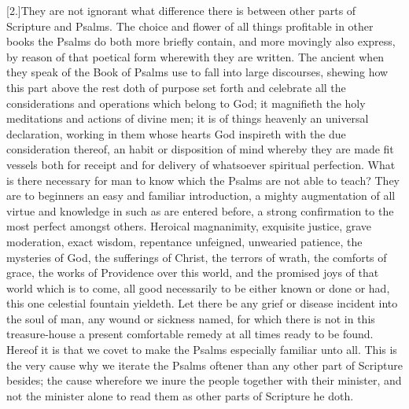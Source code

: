 [2.]They are not ignorant what difference there is between other parts of Scripture and Psalms. The choice and flower of all things profitable in other books the Psalms do both more briefly contain, and more movingly also express, by reason of that poetical form wherewith they are written. The ancient when they speak of the Book of Psalms use to fall into large discourses, shewing how this part above the rest doth of purpose set forth and celebrate all the considerations and operations which belong to God; it magnifieth the holy  meditations and actions of divine men;
 it is of things heavenly an universal declaration, working in them whose hearts God inspireth with the due consideration thereof, an habit or disposition of mind whereby they are made fit vessels both for receipt and for delivery of whatsoever spiritual perfection. What is there necessary for man to know which the Psalms are not able to teach? They are to beginners an easy and familiar introduction, a mighty augmentation of all virtue and knowledge in such as are entered before, a strong confirmation to the most perfect amongst others. Heroical magnanimity, exquisite justice, grave moderation, exact wisdom, repentance unfeigned, unwearied patience, the mysteries of God, the sufferings of Christ, the terrors of wrath, the comforts of grace, the works of Providence over this world, and the promised joys of that world which is to come, all good necessarily to be either known or done or had, this one celestial fountain yieldeth. Let there be any grief or disease incident into the soul of man, any wound or sickness named, for which there is not in this treasure-house a present comfortable remedy at all times ready to be found. Hereof it is that we covet to make the Psalms especially familiar unto all. This is the very cause why we iterate the Psalms oftener than any other part of Scripture besides; the cause wherefore we inure the people together with their minister, and not the minister alone to read them as other parts of Scripture he doth.


